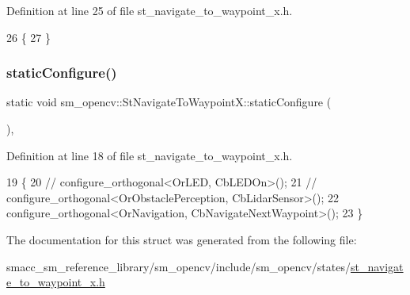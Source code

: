 Definition at line 25 of file st\+\_\+navigate\+\_\+to\+\_\+waypoint\+\_\+x.\+h.


\begin{DoxyCode}
26         \{
27         \}
\end{DoxyCode}
\mbox{\label{structsm__opencv_1_1StNavigateToWaypointX_a6a4b24a8fbf938df515162555247b246}} 
\subsubsection{\texorpdfstring{static\+Configure()}{staticConfigure()}}
{\footnotesize\ttfamily static void sm\+\_\+opencv\+::\+St\+Navigate\+To\+Waypoint\+X\+::static\+Configure (\begin{DoxyParamCaption}{ }\end{DoxyParamCaption})\hspace{0.3cm}{\ttfamily [inline]}, {\ttfamily [static]}}



Definition at line 18 of file st\+\_\+navigate\+\_\+to\+\_\+waypoint\+\_\+x.\+h.


\begin{DoxyCode}
19         \{
20             \textcolor{comment}{// configure\_orthogonal<OrLED, CbLEDOn>();}
21             \textcolor{comment}{// configure\_orthogonal<OrObstaclePerception, CbLidarSensor>();}
22             configure\_orthogonal<OrNavigation, CbNavigateNextWaypoint>();
23         \}
\end{DoxyCode}


The documentation for this struct was generated from the following file\+:\begin{DoxyCompactItemize}
\item 
smacc\+\_\+sm\+\_\+reference\+\_\+library/sm\+\_\+opencv/include/sm\+\_\+opencv/states/\hyperlink{st__navigate__to__waypoint__x_8h}{st\+\_\+navigate\+\_\+to\+\_\+waypoint\+\_\+x.\+h}\end{DoxyCompactItemize}

